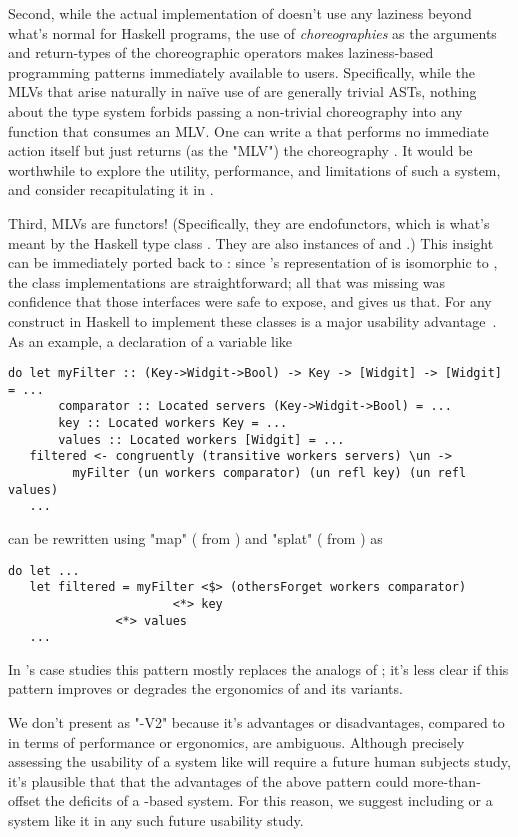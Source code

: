 Second, while the actual implementation of \minichor doesn't use any laziness beyond what's normal for Haskell programs,
the use of \emph{choreographies} as the arguments and return-types of the choreographic operators
makes laziness-based programming patterns immediately available to users.
Specifically, while the MLVs that arise naturally in naïve use of \minichor are generally trivial  ASTs,
nothing about the type system forbids passing a non-trivial choreography into any function that consumes an MLV.
One can write a  that performs no immediate action itself but just returns
(as the "MLV") the choreography .
It would be worthwhile to explore the utility, performance, and limitations of such a system,
and consider recapitulating it in \MultiChor.

Third, MLVs are functors!
(Specifically, they are endofunctors, which is what's meant by the Haskell type class .
They are also instances of  and .)
This insight can be immediately ported back to \MultiChor:
since \MultiChor's representation of  is isomorphic to ,
the class implementations are straightforward;
all that was missing was confidence that those interfaces were safe to expose, and \minichor gives us that.
For any construct in Haskell to implement these classes is a major usability advantage~\cite[Chapter~4]{haskell-cookbook}.
As an example, a \MultiChor declaration of a variable  like
\begin{verbatim}
do let myFilter :: (Key->Widgit->Bool) -> Key -> [Widgit] -> [Widgit] = ...
       comparator :: Located servers (Key->Widgit->Bool) = ...
       key :: Located workers Key = ...
       values :: Located workers [Widgit] = ...
   filtered <- congruently (transitive workers servers) \un ->
         myFilter (un workers comparator) (un refl key) (un refl values)
   ...
\end{verbatim}
can be rewritten using "map" (\inlinecode{<$>} from ) and "splat" (\inlinecode{<*>} from ) as
\begin{verbatim}
do let ...
   let filtered = myFilter <$> (othersForget workers comparator)
	                   <*> key
			   <*> values
   ...
\end{verbatim}
In \minichor's case studies this pattern mostly replaces the analogs of ;
it's less clear if this pattern improves or degrades the ergonomics of  and its variants.

We don't present \minichor as "\MultiChor-V2"
because it's advantages or disadvantages, compared to \MultiChor in terms of performance or ergonomics, are ambiguous.
Although precisely assessing the usability of a system like \MultiChor will require a future human subjects study,
it's plausible that that the advantages of the above pattern could more-than-offset the deficits of a -based system.
For this reason, we suggest including \minichor or a system like it in any such future usability study.




